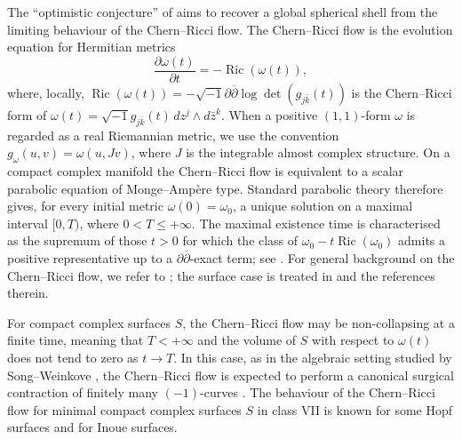 \documentclass[12pt]{amsart}
\numberwithin{equation}{section}
\theoremstyle{remark}
\theoremstyle{definition}
\begin{document}
The ``optimistic conjecture'' of \cite[Section 4.6]{fang-tosatti-weinkove-zheng} aims to recover a global spherical shell from the limiting behaviour of the Chern--Ricci flow. The Chern--Ricci flow \cite{tosatti-weinkove} is the evolution equation for Hermitian metrics
$$ \frac{\partial \omega(t)}{\partial t} = -\operatorname{Ric}(\omega(t)), $$
where, locally, $\operatorname{Ric}(\omega(t))=-\sqrt{-1}\partial\overline\partial\log\det(g_{j\bar k}(t))$ is the Chern--Ricci form of $\omega(t)=\sqrt{-1}g_{j\bar k}(t)\,dz^j\wedge d\bar z^k$. When a positive $(1,1)$-form $\omega$ is regarded as a real Riemannian metric, we use the convention $g_\omega(u,v)=\omega(u,Jv)$,  where $J$ is the integrable almost complex structure. On a compact complex manifold the Chern--Ricci flow is equivalent to a scalar parabolic equation of Monge--Amp\`ere type. Standard parabolic theory therefore gives, for every initial metric $\omega(0)=\omega_0$, a unique solution on a maximal interval $[0,T)$, where $0<T\leq+\infty$. The maximal existence time is characterised as the supremum of those $t>0$ for which the class of $\omega_0-t\operatorname{Ric}(\omega_0)$ admits a positive representative up to a $\partial\overline\partial$-exact term; see \cite{tosatti-weinkove}. For general background on the Chern--Ricci flow, we refer to \cite{tosatti-weinkove, tosatti-weinkove-survey}; the surface case is treated in \cite{tosatti-weinkove-2} and the references therein.

For compact complex surfaces $S$, the Chern--Ricci flow may be non-collapsing at a finite time, meaning that $T<+\infty$ and the volume of $S$ with respect to $\omega(t)$ does not tend to zero as $t\to T$. In this case, as in the algebraic setting studied by Song--Weinkove \cite{song-weinkove}, the Chern--Ricci flow is expected to perform a canonical surgical contraction of finitely many $(-1)$-curves \cite{tosatti-weinkove-2, nie, to}.
The behaviour of the Chern--Ricci flow for minimal compact complex surfaces $S$ in class VII is known for some Hopf surfaces and for Inoue surfaces.
\end{document}
